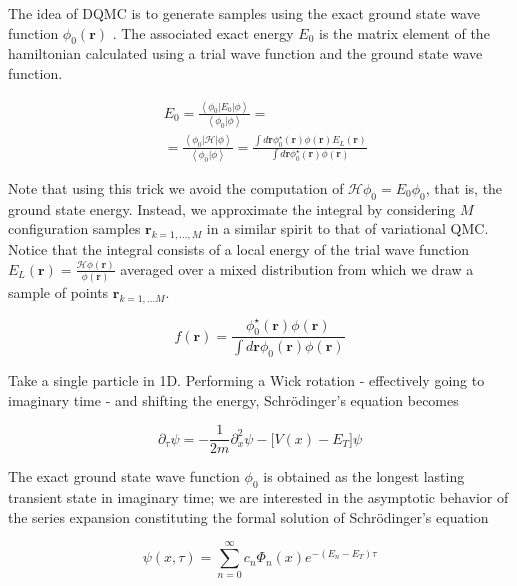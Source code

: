 \documentclass[10pt, twocolumn, twoside]{article}
\begin{document}
The idea of DQMC is to generate samples using the exact ground state wave function $\phi_0 (\bm r)$ \cite{vmc}. The associated exact energy $E_0$ is the matrix element of the hamiltonian calculated using a trial wave function and the ground state wave function.

\begin{equation}
\begin{split}
&E_0 = \frac{ \left\langle \phi_0 | E_0 | \phi \right\rangle}{\left\langle \phi_0 | \phi \right\rangle} = \\
&= \frac{\left\langle \phi_0 | \mathcal{H} | \phi \right\rangle}{ \left\langle\phi_0 | \phi \right\rangle} = \frac{\int d\bm r \phi_0^\star (\bm r) \phi (\bm r) E_L (\bm r)}{\int d\bm r\phi_0^\star (\bm r) \phi (\bm r)}
\end{split}
\end{equation}

Note that using this trick we avoid the computation of $\mathcal{H} \phi_0 = E_0 \phi_0$, that is, the ground state energy. Instead, we approximate the integral by considering $M$ configuration samples $\bm r_{k = 1,..., M}$ in a similar spirit to that of variational QMC. Notice that the integral consists of a local energy of the trial wave function $E_L (\bm r) = \frac{\mathcal{H} \phi (\bm r)}{\phi (\bm r)}$ averaged over a mixed distribution from which we draw a sample of points $\bm r_{k=1,...M}$.

\begin{equation}
f(\bm r) = \frac{\phi_0^\star (\bm r) \phi (\bm r) }{ \int d\bm r  \phi_0 (\bm r) \phi (\bm r)}
\end{equation}

Take a single particle in 1D. Performing a Wick rotation - effectively going to imaginary time - and shifting the energy, Schr\"odinger's equation becomes

\begin{equation}
\partial_\tau \psi = -\frac{1}{2m} \partial^2_x \psi - \bigg[ V(x) - E_T \bigg] \psi
\end{equation}

The exact ground state wave function $\phi_0$ is obtained as the longest lasting transient state in imaginary time; we are interested in the asymptotic behavior of the series expansion constituting the formal solution of Schr\"odinger's equation

\begin{equation}
\psi (x, \tau) = \sum_{n=0}^{\infty} c_n \Phi_n (x) e^{-(E_n - E_T)\tau}
\end{equation}
\end{document}
